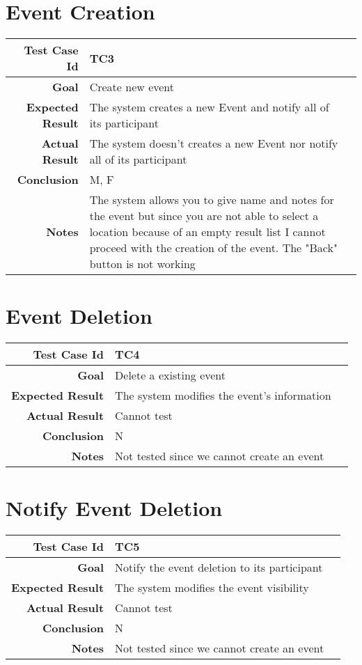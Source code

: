 \section{Event Creation}
\begin{tabularx}{\linewidth}{|r|X|X|}

  \hline   {\bf Test Case Id} &  TC3\\
  \hline  {\bf Goal} & Create new event\\
  
  \hline  {\bf Expected Result} & The system creates a new Event and notify all of its participant\\
  \hline  {\bf Actual Result} & The system doesn't creates a new Event nor notify all of its participant\\
  \hline  {\bf Conclusion} & M, F\\
  \hline  {\bf Notes} & The system allows you to give name and notes for the event but since you are not able to select a location because of an empty result list I cannot proceed with the creation of the event. The "Back" button is not working\\
  \hline
  
\end{tabularx}
\section{Event Deletion}
\begin{tabularx}{\linewidth}{|r|X|X|}

  \hline   {\bf Test Case Id} &  TC4\\
  \hline  {\bf Goal} & Delete a existing event\\
  
  \hline  {\bf Expected Result} & The system modifies the event's information\\
  \hline  {\bf Actual Result} & Cannot test\\
  \hline  {\bf Conclusion} & N\\
  \hline  {\bf Notes} & Not tested since we cannot create an event\\
  \hline
  
\end{tabularx}

\section{Notify Event Deletion}
\begin{tabularx}{\linewidth}{|r|X|X|}
\hline   {\bf Test Case Id} &  TC5\\
  \hline  {\bf Goal} & Notify the event deletion to its participant\\
 
  \hline  {\bf Expected Result} & The system modifies the event visibility\\

    \hline  {\bf Actual Result} & Cannot test\\
  \hline  {\bf Conclusion} & N\\
  \hline  {\bf Notes} & Not tested since we cannot create an event\\  \hline
  
\end{tabularx}

